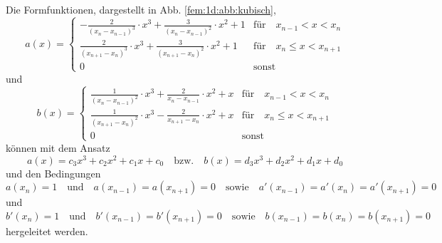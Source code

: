 Die Formfunktionen, dargestellt in Abb. \ref{fem:1d:abb:kubisch}, 
\begin{equation}
    a(x) = \left\{ \begin{array}{ll}
        - \frac{2}{(x_n - x_{n-1})^3} \cdot x^3 + \frac{3}{(x_n - x_{n-1})^2} \cdot x^2 + 1 
            & \text{für} \quad x_{n-1} < x < x_n \\
        \frac{2}{(x_{n+1} - x_n)^3} \cdot x^3 + \frac{3}{(x_{n+1} - x_n)^2} \cdot x^2 + 1 
            & \text{für} \quad x_n \leq x < x_{n+1} \\
        0
            & \text{sonst}
    \end{array} \right.
\end{equation}
und
\begin{equation}
    b(x) = \left\{ \begin{array}{ll}
        \frac{1}{(x_n - x_{n-1})^2} \cdot x^3 + \frac{2}{x_n - x_{n-1}} \cdot x^2 + x 
            & \text{für} \quad x_{n-1} < x < x_n \\
        \frac{1}{(x_{n+1} - x_n)^2} \cdot x^3 - \frac{2}{x_{n+1} - x_n} \cdot x^2 + x 
            & \text{für} \quad x_n \leq x < x_{n+1} \\
        0
            & \text{sonst}
    \end{array} \right.
\end{equation}
können mit dem Ansatz
\begin{equation}
    a(x) = c_3x^3 + c_2x^2 + c_1x + c_0 
    \quad \text{bzw.} \quad
    b(x) = d_3x^3 + d_2x^2 + d_1x + d_0
\end{equation}
und den Bedingungen 
\begin{equation}
        a(x_n) = 1 
        \quad \text{und} \quad
        a(x_{n-1}) = a(x_{n+1}) = 0 
        \quad \text{sowie} \quad
        a'(x_{n-1}) = a'(x_n) = a'(x_{n+1}) = 0
\end{equation}
und
\begin{equation}
        b'(x_n) = 1 
        \quad \text{und} \quad
        b'(x_{n-1}) = b'(x_{n+1}) = 0 
        \quad \text{sowie} \quad
        b(x_{n-1}) = b(x_n) = b(x_{n+1}) = 0
\end{equation}
hergeleitet werden.


